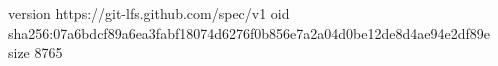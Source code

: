 version https://git-lfs.github.com/spec/v1
oid sha256:07a6bdcf89a6ea3fabf18074d6276f0b856e7a2a04d0be12de8d4ae94e2df89e
size 8765
